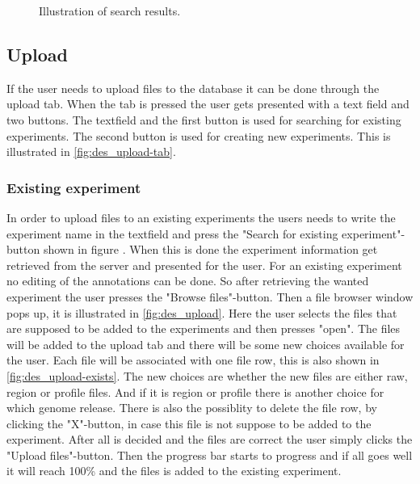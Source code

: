 \begin{figure}[htb]
	\caption{Illustration of search results.}
	\label{fig:des_search-results}
\end{figure}
\FloatBarrier

\subsection{Upload}
If the user needs to upload files to the database it can be done through the upload tab. When the tab is pressed the user gets presented with a text field and two buttons. The textfield and the first button is used for searching for existing experiments. The second button is used for creating new experiments. This is illustrated in \ref{fig:des_upload-tab}.
\subsubsection{Existing experiment}
\label{sec:des_exists}
In order to upload files to an existing experiments the users needs to write the experiment name in the textfield and press the "Search for existing experiment"-button shown in figure . When this is done the experiment information get retrieved from the server and presented for the user. For an existing experiment no editing of the annotations can be done. So after retrieving the wanted experiment the user presses the "Browse files"-button. Then a file browser window pops up, it is illustrated in \ref{fig:des_upload}. Here the user selects the files that are supposed to be added to the experiments and then presses "open". The files will be added to the upload tab and there will be some new choices available for the user. Each file  will be associated with one file row, this is also shown in \ref{fig:des_upload-exists}. The new choices are whether the new files are either raw, region or profile files. And if it is region or profile there is another choice for which genome release. There is also the possiblity to delete the file row, by clicking the "X"-button, in case this file is not suppose to be added to the experiment. After all is decided and the files are correct the user simply clicks the "Upload files"-button. Then the progress bar starts to progress and if all goes well it will reach 100\% and the files is added to the existing experiment.
